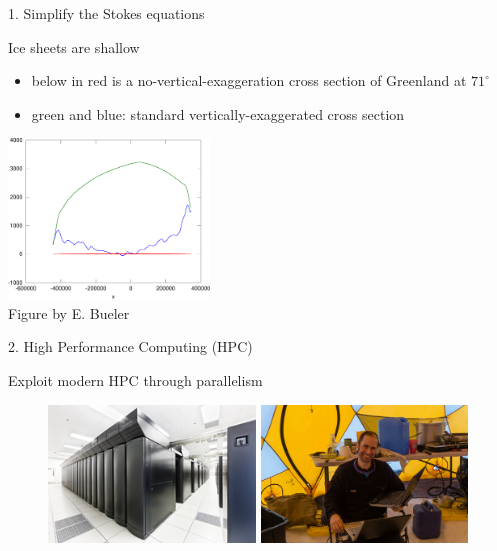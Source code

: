 \documentclass[hide notes,intlimits,unknownkeysallowed]{beamer}
\begin{document}
\begin{frame}{1. Simplify the Stokes equations}
  \begin{block}{Ice sheets are shallow}
    \begin{itemize}
    \item below in red is a no-vertical-exaggeration cross section of Greenland at $71^\circ$
      \small
    \item green and blue: standard vertically-exaggerated cross section
    \end{itemize}
    \begin{center}
      \includegraphics[width=0.4\textwidth]{green_transect} \\
      \footnotesize{Figure by E. Bueler}
    \end{center}
  \end{block}
\end{frame}

\begin{frame}{2. High Performance Computing (HPC)}
  \begin{block}{Exploit modern HPC through parallelism}
    \begin{figure}
      \includegraphics[width=5.5cm]{bw_front_sm}
      \hfill
      \includegraphics[width=5.5cm]{jason-parallel}
    \end{figure}
  \end{block}
\end{frame}
\end{document}
